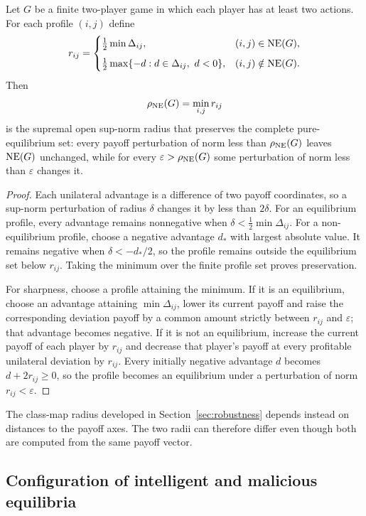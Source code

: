 \begin{theorem}
\label{thm:ne-radius}
Let $G$ be a finite two-player game in which each player has at least two actions. For each profile $(i,j)$ define
\[
r_{ij}=\begin{cases}
\tfrac12\min\Delta_{ij}, & (i,j)\in\operatorname{NE}(G),\\[2mm]
\tfrac12\max\{-d:d\in\Delta_{ij},\ d<0\}, & (i,j)\notin\operatorname{NE}(G).
\end{cases}
\]
Then
\[
\rho_{\operatorname{NE}}(G)=\min_{i,j}r_{ij}
\]
is the supremal open sup-norm radius that preserves the complete pure-equilibrium set: every payoff perturbation of norm less than $\rho_{\operatorname{NE}}(G)$ leaves $\operatorname{NE}(G)$ unchanged, while for every $\varepsilon>\rho_{\operatorname{NE}}(G)$ some perturbation of norm less than $\varepsilon$ changes it.
\end{theorem}

\begin{proof}
Each unilateral advantage is a difference of two payoff coordinates, so a sup-norm perturbation of radius $\delta$ changes it by less than $2\delta$. For an equilibrium profile, every advantage remains nonnegative when $\delta<\tfrac12\min\Delta_{ij}$. For a non-equilibrium profile, choose a negative advantage $d_*$ with largest absolute value. It remains negative when $\delta<-d_*/2$, so the profile remains outside the equilibrium set below $r_{ij}$. Taking the minimum over the finite profile set proves preservation.

For sharpness, choose a profile attaining the minimum. If it is an equilibrium, choose an advantage attaining $\min\Delta_{ij}$, lower its current payoff and raise the corresponding deviation payoff by a common amount strictly between $r_{ij}$ and $\varepsilon$; that advantage becomes negative. If it is not an equilibrium, increase the current payoff of each player by $r_{ij}$ and decrease that player's payoff at every profitable unilateral deviation by $r_{ij}$. Every initially negative advantage $d$ becomes $d+2r_{ij}\ge0$, so the profile becomes an equilibrium under a perturbation of norm $r_{ij}<\varepsilon$.
\end{proof}

The class-map radius developed in Section~\ref{sec:robustness} depends instead on distances to the payoff axes. The two radii can therefore differ even though both are computed from the same payoff vector.

\subsection{Configuration of intelligent and malicious equilibria}
\label{sec:general-theorem}

